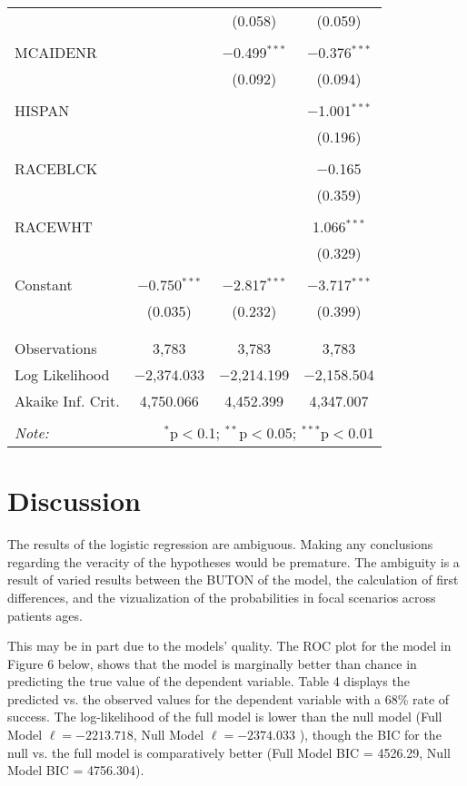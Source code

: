 \documentclass{article}
\begin{document}
\begin{table}[h]
\begin{tabular}{@{\extracolsep{5pt}}lccc}
  &  & (0.058) & (0.059) \\ 
  & & & \\ 
 MCAIDENR &  & $-$0.499$^{***}$ & $-$0.376$^{***}$ \\ 
  &  & (0.092) & (0.094) \\ 
  & & & \\ 
 HISPAN &  &  & $-$1.001$^{***}$ \\ 
  &  &  & (0.196) \\ 
  & & & \\ 
 RACEBLCK &  &  & $-$0.165 \\ 
  &  &  & (0.359) \\ 
  & & & \\ 
 RACEWHT &  &  & 1.066$^{***}$ \\ 
  &  &  & (0.329) \\ 
  & & & \\ 
 Constant & $-$0.750$^{***}$ & $-$2.817$^{***}$ & $-$3.717$^{***}$ \\ 
  & (0.035) & (0.232) & (0.399) \\ 
  & & & \\ 
\hline \\[-1.8ex] 
Observations & 3,783 & 3,783 & 3,783 \\ 
Log Likelihood & $-$2,374.033 & $-$2,214.199 & $-$2,158.504 \\ 
Akaike Inf. Crit. & 4,750.066 & 4,452.399 & 4,347.007 \\ 
\hline 
\hline \\[-1.8ex] 
\textit{Note:}  & \multicolumn{3}{r}{$^{*}$p$<$0.1; $^{**}$p$<$0.05; $^{***}$p$<$0.01} \\ 
\end{tabular} 
\end{table} 

\section{Discussion}

The results of the logistic regression are ambiguous. Making any conclusions regarding the veracity of the hypotheses would be premature. The ambiguity is a result of varied results between the BUTON of the model, the calculation of first differences, and the vizualization of the probabilities in focal scenarios across patients ages. 

This may be in part due to the models' quality. The ROC plot for the model in Figure 6 below, shows that the model is marginally better than chance in predicting the true value of the dependent variable. Table 4 displays the predicted vs. the observed values for the dependent variable with a 68\% rate of success. The log-likelihood of the full model is lower than the null model (Full Model $\ell = -2213.718 $, Null Model $\ell = -2374.033 $ ), though the BIC for the null vs. the full model is comparatively better (Full Model BIC = 4526.29, Null Model BIC = 4756.304). 
\end{document}
